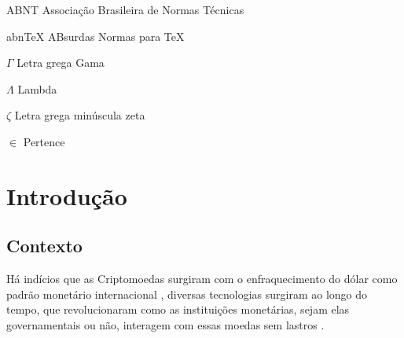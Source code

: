 \documentclass[
article,			%
12pt,				%
openright,			%
oneside,			%
a4paper,			%
chapter=TITLE,		%
section=TITLE,		%
subsection=TITLE,	%
subsubsection=TITLE,%
subsubsubsection=TITLE, %
english,			%
brazil,				%
]{abntex2}
\begin{document}

\listoffigures*
\cleardoublepage

\listoftables*
\cleardoublepage

\begin{siglas}
\item[ABNT] Associação Brasileira de Normas Técnicas
\item[abnTeX] ABsurdas Normas para TeX
\end{siglas}

\begin{simbolos}
\item[$ \Gamma $] Letra grega Gama
\item[$ \Lambda $] Lambda
\item[$ \zeta $] Letra grega minúscula zeta
\item[$ \in $] Pertence
\end{simbolos}

\tableofcontents*
\cleardoublepage


\textual

\section{Introdução}

\subsection{Contexto}

Há indícios que as Criptomoedas surgiram com o enfraquecimento do
dólar como padrão monetário internacional \cite{FAE2014}, diversas
tecnologias surgiram ao longo do tempo, que revolucionaram como as
instituições monetárias, sejam elas governamentais ou não, interagem
com essas moedas sem lastros \cite{Said2017}. 
\end{document}
